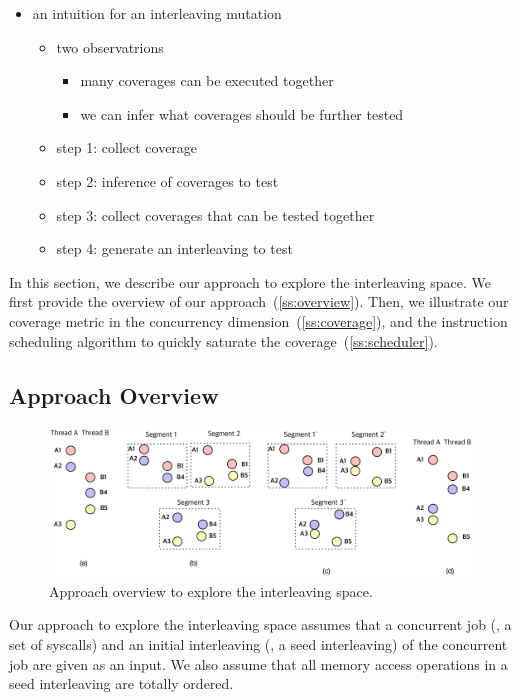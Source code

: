 {\begin{itemize}
\item an intuition for an interleaving mutation
  \begin{itemize}
  \item two observatrions
    \begin{itemize}
      \item many coverages can be executed together
      \item we can infer what coverages should be further tested
      \end{itemize}
  \item step 1: collect coverage
  \item step 2: inference of coverages to test
  \item step 3: collect coverages that can be tested together
  \item step 4: generate an interleaving to test
  \end{itemize}
\end{itemize}
}


In this section, we describe our approach to explore the interleaving
space.
%
We first provide the overview of our
approach~(\autoref{ss:overview}). Then, we illustrate our coverage
metric in the concurrency dimension~(\autoref{ss:coverage}), and the
instruction scheduling algorithm to quickly saturate the
coverage~(\autoref{ss:scheduler}).

\subsection{Approach Overview}
\label{ss:overview}

\begin{figure}[ht]
  \includegraphics[width=0.9\linewidth]{fig/intuition.pdf}
  \caption{Approach overview to explore the interleaving
    space. }
  \label{fig:overview}
\end{figure}



Our approach to explore the interleaving space assumes that a
concurrent job (\eg, a set of syscalls) and an initial interleaving
(\ie, a seed interleaving) of the concurrent job are given as an
input. We also assume that all memory access operations in a seed
interleaving are totally ordered.

